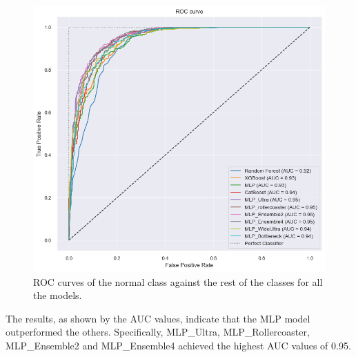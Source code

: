 \begin{figure}[H]
    \centering
    \includegraphics[width=1\columnwidth]{./images/ROC_normVSrest_allmodels.png}
    \caption{ROC curves of the normal class against the rest of the classes for all the models.}
    \label{fig:ROC_normVSrest_allmodels}
\end{figure}

\noindent
The results, as shown by the AUC values, indicate that the MLP model outperformed the others. Specifically, 
MLP\_Ultra, MLP\_Rollercoaster, MLP\_Ensemble2 and MLP\_Ensemble4 achieved the highest AUC values of 0.95.



